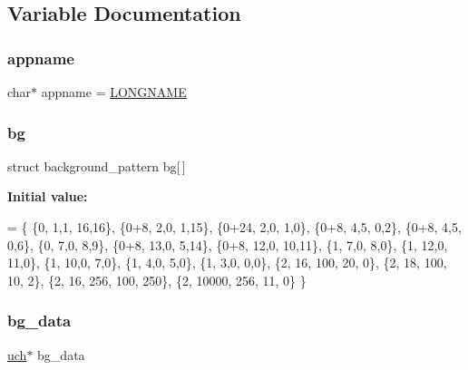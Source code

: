\subsection{Variable Documentation}
\mbox{\label{rpng2-x_8c_a9db0329b02c3e8e0260939a1c680738a}} 
\subsubsection{\texorpdfstring{appname}{appname}}
{\footnotesize\ttfamily char$\ast$ appname = \mbox{\hyperlink{_visual_png_8c_ae8176192ea4d52bb0acbcfeaaffb3bd8}{L\+O\+N\+G\+N\+A\+ME}}\hspace{0.3cm}{\ttfamily [static]}}

\mbox{\label{rpng2-x_8c_a808fa6d3573a86afa3ba7698a65b1ef6}} 
\subsubsection{\texorpdfstring{bg}{bg}}
{\footnotesize\ttfamily struct background\+\_\+pattern  bg\mbox{[}$\,$\mbox{]}\hspace{0.3cm}{\ttfamily [static]}}

{\bfseries Initial value\+:}
\begin{DoxyCode}
= \{
    \{0,     1,1, 16,16\},        
    \{0+8,   2,0,  1,15\},        
    \{0+24,  2,0,  1,0\},         
    \{0+8,   4,5,  0,2\},         
    \{0+8,   4,5,  0,6\},         
    \{0,     7,0,  8,9\},         
    \{0+8,  13,0,  5,14\},        
    \{0+8,  12,0, 10,11\},        
    \{1,     7,0,  8,0\},         
    \{1,    12,0, 11,0\},         
    \{1,    10,0,  7,0\},         
    \{1,     4,0,  5,0\},         
    \{1,     3,0,  0,0\},         
    \{2,    16, 100,  20,   0\},  
    \{2,    18, 100,  10,   2\},  
    \{2,    16, 256, 100, 250\},  
    \{2, 10000, 256,  11,   0\}   
\}
\end{DoxyCode}
\mbox{\label{rpng2-x_8c_ae7b1caf5caf0f274b142e9792622dac4}} 
\subsubsection{\texorpdfstring{bg\+\_\+data}{bg\_data}}
{\footnotesize\ttfamily \mbox{\hyperlink{readpng_8h_af3307af5922c72924a837559c801a8a4}{uch}}$\ast$ bg\+\_\+data\hspace{0.3cm}{\ttfamily [static]}}

